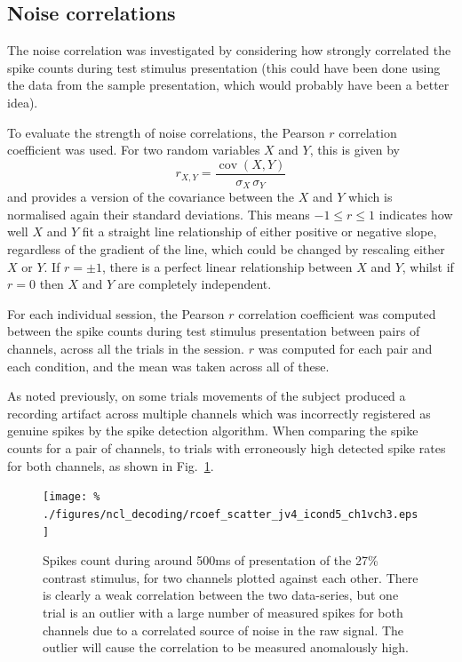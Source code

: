 \subsection{Noise correlations}
\label{sec:dec-meth-noise}

The noise correlation was investigated by considering how strongly correlated the spike counts during test stimulus presentation (this could have been done using the data from the sample presentation, which would probably have been a better idea).

To evaluate the strength of noise correlations, the Pearson $r$ correlation coefficient was used. For two random variables $X$ and $Y$, this is given by
$$r_{X,Y} = \frac{\operatorname{cov}(X,Y)}{\sigma_X \, \sigma_Y}$$
and provides a version of the covariance between the $X$ and $Y$ which is normalised again their standard deviations.
This means $-1 \le r \le 1$ indicates how well $X$ and $Y$ fit a straight line relationship of either positive or negative slope, regardless of the gradient of the line, which could be changed by rescaling either $X$ or $Y$. If $r=\pm1$, there is a perfect linear relationship between $X$ and $Y$, whilst if $r=0$ then $X$ and $Y$ are completely independent.

For each individual session, the Pearson $r$ correlation coefficient was computed between the spike counts during test stimulus presentation between pairs of channels, across all the trials in the session. $r$ was computed for each pair and each condition, and the mean was taken across all of these.

As noted previously, on some trials movements of the subject produced a recording artifact across multiple channels which was incorrectly registered as genuine spikes by the spike detection algorithm. When comparing the spike counts for a pair of channels, to trials with erroneously high detected spike rates for both channels, as shown in Fig.~\ref{fig:noise_scatter}.

\begin{figure}[htbp]
\centering\texttt{[image: \%
./figures/ncl\_decoding/rcoef\_scatter\_jv4\_icond5\_ch1vch3.eps]}
\caption{Spikes count during around 500ms of presentation of the 27\% contrast stimulus, for two channels plotted against each other. There is clearly a weak correlation between the two data-series, but one trial is an outlier with a large number of measured spikes for both channels due to a correlated source of noise in the raw signal. The outlier will cause the correlation to be measured anomalously high.}
\label{fig:noise_scatter}
\end{figure}

